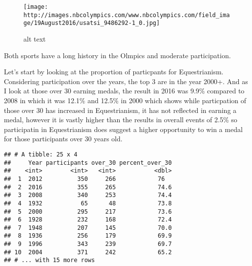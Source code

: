 \documentclass[]{article}
\newenvironment{Shaded}{\begin{snugshade}}{\end{snugshade}}
\newcommand{\KeywordTok}[1]{\textcolor[rgb]{0.13,0.29,0.53}{\textbf{#1}}}
\newcommand{\DataTypeTok}[1]{\textcolor[rgb]{0.13,0.29,0.53}{#1}}
\newcommand{\DecValTok}[1]{\textcolor[rgb]{0.00,0.00,0.81}{#1}}
\newcommand{\StringTok}[1]{\textcolor[rgb]{0.31,0.60,0.02}{#1}}
\newcommand{\OperatorTok}[1]{\textcolor[rgb]{0.81,0.36,0.00}{\textbf{#1}}}
\newcommand{\NormalTok}[1]{#1}
\begin{document}
\begin{figure}
\centering
\texttt{[image: http://images.nbcolympics.com/www.nbcolympics.com/field\_image/19August2016/usatsi\_9486292-1\_0.jpg]}
\caption{alt text}
\end{figure}

Both sports have a long history in the Olmpics and moderate
participation.

Let's start by looking at the proportion of particpants for
Equestrianism. Considering participation over the years, the top 3 are
in the year 2000+. And as I look at those over 30 earning medals, the
result in 2016 was 9.9\% compared to 2008 in which it was 12.1\% and
12.5\% in 2000 which shows while particpation of those over 30 has
increased in Equestrianism, it has not reflected in earning a medal,
however it is vastly higher than the results in overall events of 2.5\%
so participatin in Equestrianism does suggest a higher opportunity to
win a medal for those participants over 30 years old.

\begin{Shaded}
\end{Shaded}

\begin{verbatim}
## # A tibble: 25 x 4
##     Year participants over_30 percent_over_30
##    <int>        <int>   <int>           <dbl>
##  1  2012          350     266            76  
##  2  2016          355     265            74.6
##  3  2008          340     253            74.4
##  4  1932           65      48            73.8
##  5  2000          295     217            73.6
##  6  1928          232     168            72.4
##  7  1948          207     145            70.0
##  8  1936          256     179            69.9
##  9  1996          343     239            69.7
## 10  2004          371     242            65.2
## # ... with 15 more rows
\end{verbatim}
\end{document}
